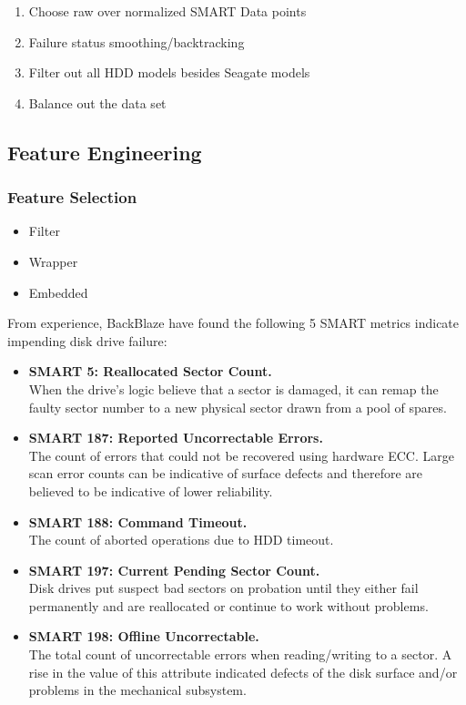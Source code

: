 \documentclass[12pt,a4paper,english]{amsart}
\begin{document}
\begin{enumerate}
	\item Choose raw over normalized SMART Data points
	\item Failure status smoothing/backtracking
	\item Filter out all HDD models besides Seagate models
	\item Balance out the data set
\end{enumerate}

\subsection{Feature Engineering}

\subsubsection*{Feature Selection}

\begin{itemize}
	\item Filter
	\item Wrapper
	\item Embedded
\end{itemize}

From experience, BackBlaze have found the following 5 SMART metrics indicate impending disk drive failure:

\begin{itemize}
	\item \textbf{SMART 5: Reallocated Sector Count.} \\
	When the drive’s logic believe that a sector is damaged, it can remap the faulty sector number to a new physical sector drawn from a pool of spares.
	\item \textbf{SMART 187: Reported Uncorrectable Errors.} \\
	The count of errors that could not be recovered using hardware ECC. Large scan error counts can be indicative of surface defects and therefore are believed to be indicative of lower reliability.
	\item \textbf{SMART 188: Command Timeout.} \\
	The count of aborted operations due to HDD timeout.
	\item \textbf{SMART 197: Current Pending Sector Count.} \\
	Disk drives put suspect bad sectors on probation until they either fail permanently and are reallocated or continue to work without problems.
	\item \textbf{SMART 198: Offline Uncorrectable.} \\
	The total count of uncorrectable errors when reading/writing to a sector. A rise in the value of this attribute indicated defects of the disk surface and/or problems in the mechanical subsystem.
\end{itemize}
\end{document}
